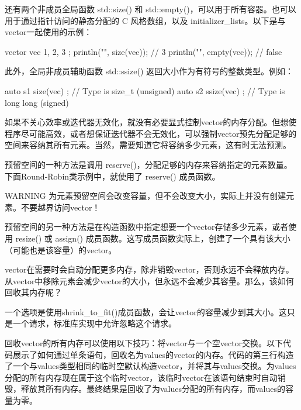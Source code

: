 还有两个非成员全局函数 std::size() 和 std::empty()，可以用于所有容器。也可以用于通过指针访问的静态分配的 C 风格数组，以及 initializer\_lists。以下是与vector一起使用的示例：

\begin{cpp}
vector vec { 1, 2, 3 };
println("{}", size(vec)); // 3
println("{}", empty(vec)); // false
\end{cpp}

此外，全局非成员辅助函数 std::ssize() 返回大小作为有符号的整数类型。例如：

\begin{cpp}
auto s1 { size(vec) }; // Type is size_t (unsigned)
auto s2 { ssize(vec) }; // Type is long long (signed)
\end{cpp}


如果不关心效率或迭代器无效化，就没有必要显式控制vector的内存分配。但想使程序尽可能高效，或者想保证迭代器不会无效化，可以强制vector预先分配足够的空间来容纳其所有元素。当然，需要知道它将容纳多少元素，这有时无法预测。

预留空间的一种方法是调用 reserve()，分配足够的内存来容纳指定的元素数量。下面Round-Robin类示例中，就使用了 reserve() 成员函数。

\begin{myWarning}{WARNING}
为元素预留空间会改变容量，但不会改变大小，实际上并没有创建元素。不要越界访问vector！
\end{myWarning}

预留空间的另一种方法是在构造函数中指定想要一个vector存储多少元素，或者使用 resize() 或 assign() 成员函数。这写成员函数实际上，创建了一个具有该大小（可能也是该容量）的vector。


vector在需要时会自动分配更多内存，除非销毁vector，否则永远不会释放内存。从vector中移除元素会减少vector的大小，但永远不会减少其容量。那么，该如何回收其内存呢？

一个选项是使用shrink\_to\_fit()成员函数，会让vector的容量减少到其大小。这只是一个请求，标准库实现中允许忽略这个请求。

回收vector的所有内存可以使用以下技巧：将vector与一个空vector交换。以下代码展示了如何通过单条语句，回收名为values的vector的内存。代码的第三行构造了一个与values类型相同的临时空默认构造vector，并将其与values交换。为values分配的所有内存现在属于这个临时vector，该临时vector在该语句结束时自动销毁，释放其所有内存。最终结果是回收了为values分配的所有内存，而values的容量为零。

